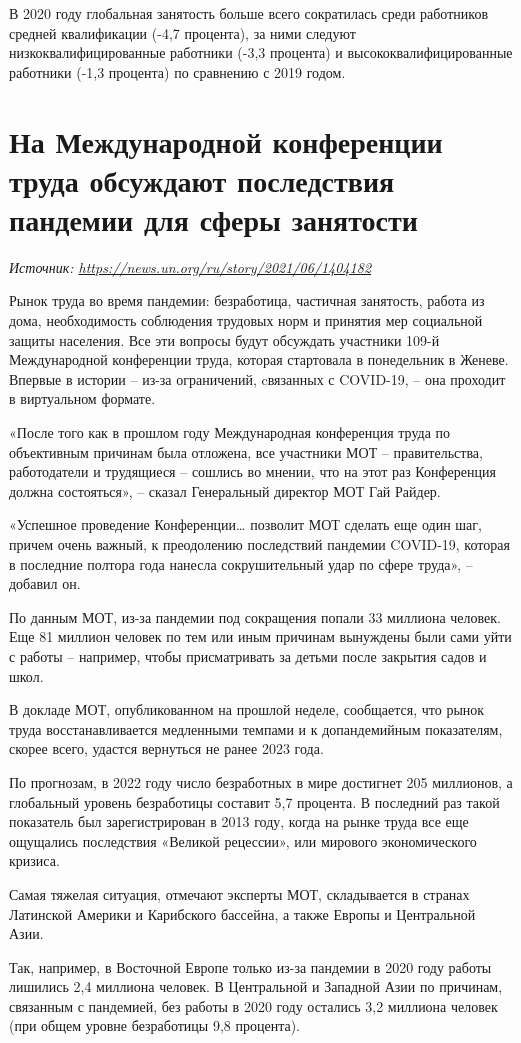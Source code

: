 В 2020 году глобальная занятость больше всего сократилась среди работников средней квалификации (-4,7 процента), за ними следуют низкоквалифицированные работники (-3,3 процента) и высококвалифицированные работники (-1,3 процента) по сравнению с 2019 годом.


\newpage
\section[Последствия пандемии для сферы занятости]{На Международной конференции труда обсуждают последствия пандемии для сферы занятости}

\textit{Источник: \url{https://news.un.org/ru/story/2021/06/1404182}}

\begin{fancyquotes}
    Рынок труда во время пандемии: безработица, частичная занятость, работа из дома, необходимость соблюдения трудовых норм и принятия мер социальной защиты населения. Все эти вопросы будут обсуждать участники 109-й Международной конференции труда, которая стартовала в понедельник в Женеве. Впервые в истории – из-за ограничений, cвязанных с COVID-19, – она проходит в виртуальном формате.
\end{fancyquotes}

«После того как в прошлом году Международная конференция труда по объективным причинам была отложена, все участники МОТ – правительства, работодатели и трудящиеся – сошлись во мнении, что на этот раз Конференция должна состояться», – сказал Генеральный директор МОТ Гай Райдер.


«Успешное проведение Конференции… позволит МОТ сделать еще один шаг, причем очень важный, к преодолению последствий пандемии COVID-19, которая в последние полтора года нанесла сокрушительный удар по сфере труда», – добавил он.

По данным МОТ, из-за пандемии под сокращения попали 33 миллиона человек. Еще 81 миллион человек по тем или иным причинам вынуждены были сами уйти с работы – например, чтобы присматривать за детьми после закрытия садов и школ.

В докладе МОТ, опубликованном на прошлой неделе, сообщается, что рынок труда восстанавливается медленными темпами и к допандемийным показателям, скорее всего, удастся вернуться не ранее 2023 года.

По прогнозам, в 2022 году число безработных в мире достигнет 205 миллионов, а глобальный уровень безработицы составит 5,7 процента. В последний раз такой показатель был зарегистрирован в 2013 году, когда на рынке труда все еще ощущались последствия «Великой рецессии», или мирового экономического кризиса.

Самая тяжелая ситуация, отмечают эксперты МОТ, складывается в странах Латинской Америки и Карибского бассейна, а также Европы и Центральной Азии.

Так, например, в Восточной Европе только из-за пандемии в 2020 году работы лишились 2,4 миллиона человек. В Центральной и Западной Азии по причинам, связанным с пандемией, без работы в 2020 году остались 3,2 миллиона человек (при общем уровне безработицы 9,8 процента).